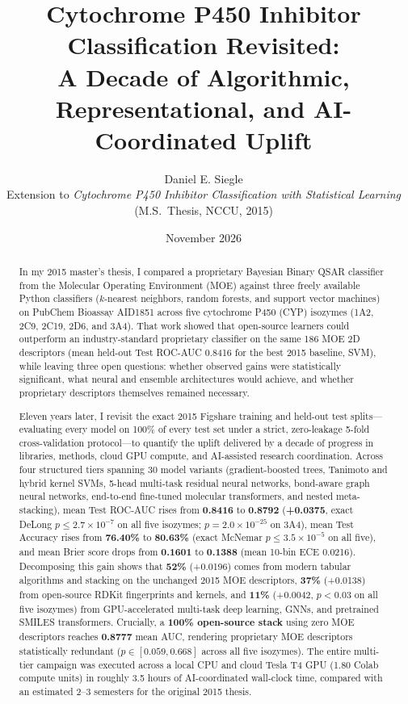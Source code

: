 \documentclass[11pt]{article}
\title{\textbf{Cytochrome P450 Inhibitor Classification Revisited:\\
A Decade of Algorithmic, Representational, and AI-Coordinated Uplift}}
\author{Daniel E. Siegle\\
\footnotesize Extension to \emph{Cytochrome P450 Inhibitor Classification with Statistical Learning} (M.S.\ Thesis, NCCU, 2015)}
\date{November 2026}
\begin{document}
\maketitle

\begin{abstract}
In my 2015 master's thesis, I compared a proprietary Bayesian Binary QSAR classifier from the Molecular Operating Environment (MOE) against three freely available Python classifiers ($k$-nearest neighbors, random forests, and support vector machines) on PubChem Bioassay AID1851 across five cytochrome P450 (CYP) isozymes (1A2, 2C9, 2C19, 2D6, and 3A4). That work showed that open-source learners could outperform an industry-standard proprietary classifier on the same 186 MOE 2D descriptors (mean held-out Test ROC-AUC 0.8416 for the best 2015 baseline, SVM), while leaving three open questions: whether observed gains were statistically significant, what neural and ensemble architectures would achieve, and whether proprietary descriptors themselves remained necessary.

Eleven years later, I revisit the exact 2015 Figshare training and held-out test splits---evaluating every model on 100\% of every test set under a strict, zero-leakage 5-fold cross-validation protocol---to quantify the uplift delivered by a decade of progress in libraries, methods, cloud GPU compute, and AI-assisted research coordination. Across four structured tiers spanning 30 model variants (gradient-boosted trees, Tanimoto and hybrid kernel SVMs, 5-head multi-task residual neural networks, bond-aware graph neural networks, end-to-end fine-tuned molecular transformers, and nested meta-stacking), mean Test ROC-AUC rises from \textbf{0.8416} to \textbf{0.8792} (\textbf{+0.0375}, exact DeLong $p \le 2.7 \times 10^{-7}$ on all five isozymes; $p = 2.0 \times 10^{-25}$ on 3A4), mean Test Accuracy rises from \textbf{76.40\%} to \textbf{80.63\%} (exact McNemar $p \le 3.5 \times 10^{-5}$ on all five), and mean Brier score drops from \textbf{0.1601} to \textbf{0.1388} (mean 10-bin ECE 0.0216). Decomposing this gain shows that \textbf{52\%} (+0.0196) comes from modern tabular algorithms and stacking on the unchanged 2015 MOE descriptors, \textbf{37\%} (+0.0138) from open-source RDKit fingerprints and kernels, and \textbf{11\%} (+0.0042, $p < 0.03$ on all five isozymes) from GPU-accelerated multi-task deep learning, GNNs, and pretrained SMILES transformers. Crucially, a \textbf{100\% open-source stack} using zero MOE descriptors reaches \textbf{0.8777} mean AUC, rendering proprietary MOE descriptors statistically redundant ($p \in [0.059, 0.668]$ across all five isozymes). The entire multi-tier campaign was executed across a local CPU and cloud Tesla T4 GPU (1.80 Colab compute units) in roughly 3.5 hours of AI-coordinated wall-clock time, compared with an estimated 2--3 semesters for the original 2015 thesis.
\end{abstract}
\end{document}

